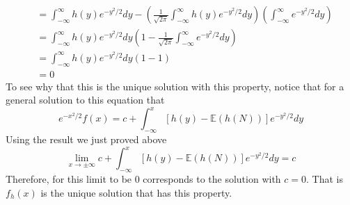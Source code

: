 \documentclass[12pt]{article}  %
\newcommand{\E}{{\mathbb{E}}}
\begin{document}
\begin{enumerate}
\begin{enumerate}
\begin{align*}
&= \int_{-\infty}^{\infty}h(y)e^{-y^2/2}dy -  \left(\frac{1}{\sqrt{2\pi}}\int_{-\infty}^{\infty}h(y)e^{-y^2/2}dy\right)\left(\int_{-\infty}^{\infty}e^{-y^2/2}dy\right)\\
&= \int_{-\infty}^{\infty}h(y)e^{-y^2/2}dy\left(1 - \frac{1}{\sqrt{2\pi}}\int_{-\infty}^{\infty}e^{-y^2/2}dy\right)\\
&= \int_{-\infty}^{\infty}h(y)e^{-y^2/2}dy\left(1 - 1\right)\\
&= 0 
\end{align*}
To see why that this is the unique solution with this property, notice that for a general solution to this equation that $$e^{-x^2/2}f(x) = c + \int_{-\infty}^x [h(y) - \E(h(N))]e^{-y^2/2}dy$$ Using the result we just proved above $$\lim_{x\to\pm\infty} c + \int_{-\infty}^x [h(y) - \E(h(N))]e^{-y^2/2}dy = c$$ Therefore, for this limit to be $0$ corresponds to the solution with $c = 0$. That is $f_h(x)$ is the unique solution that has this property. 
\end{enumerate}

\end{enumerate}	
\end{document}
